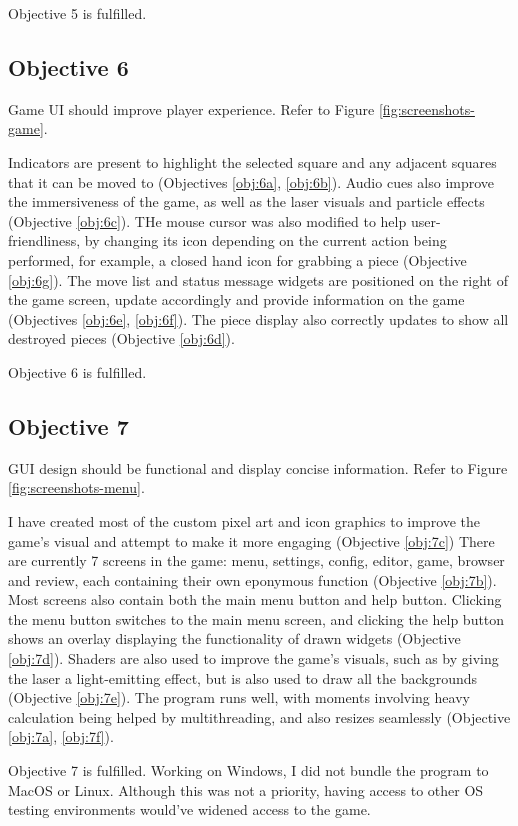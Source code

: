 \documentclass[../main/main.tex]{subfiles}
\begin{document}
Objective 5 is fulfilled.

\subsection{Objective 6}
Game UI should improve player experience. Refer to Figure \ref{fig:screenshots-game}.

Indicators are present to highlight the selected square and any adjacent squares that it can be moved to (Objectives \ref{obj:6a}, \ref{obj:6b}). Audio cues also improve the immersiveness of the game, as well as the laser visuals and particle effects (Objective \ref{obj:6c}). THe mouse cursor was also modified to help user-friendliness, by changing its icon depending on the current action being performed, for example, a closed hand icon for grabbing a piece (Objective \ref{obj:6g}). The move list and status message widgets are positioned on the right of the game screen, update accordingly and provide information on the game (Objectives \ref{obj:6e}, \ref{obj:6f}). The piece display also correctly updates to show all destroyed pieces (Objective \ref{obj:6d}).

Objective 6 is fulfilled.

\subsection{Objective 7}
GUI design should be functional and display concise information. Refer to Figure \ref{fig:screenshots-menu}.

I have created most of the custom pixel art and icon graphics to improve the game's visual and attempt to make it more engaging (Objective \ref{obj:7c}) There are currently 7 screens in the game: menu, settings, config, editor, game, browser and review, each containing their own eponymous function (Objective \ref{obj:7b}). Most screens also contain both the main menu button and help button. Clicking the menu button switches to the main menu screen, and clicking the help button shows an overlay displaying the functionality of drawn widgets (Objective \ref{obj:7d}). Shaders are also used to improve the game's visuals, such as by giving the laser a light-emitting effect, but is also used to draw all the backgrounds (Objective \ref{obj:7e}). The program runs well, with moments involving heavy calculation being helped by multithreading, and also resizes seamlessly (Objective \ref{obj:7a}, \ref{obj:7f}).

Objective 7 is fulfilled. Working on Windows, I did not bundle the program to MacOS or Linux. Although this was not a priority, having access to other OS testing environments would've widened access to the game.
\end{document}
